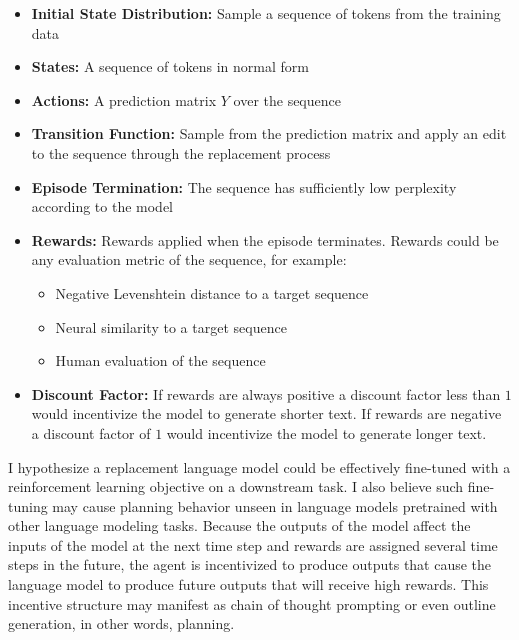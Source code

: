 \documentclass{article}
\begin{document}
\begin{itemize}


    \item{\textbf{Initial State Distribution:} Sample a sequence of tokens from the training data}

    \item {\textbf{States:} A sequence of tokens in normal form}

    \item {\textbf{Actions:} A prediction matrix $Y$ over the sequence}

    \item {\textbf{Transition Function:} Sample from the prediction matrix and apply an edit to the sequence through the replacement process}

    \item {\textbf{Episode Termination:} The sequence has sufficiently low perplexity according to the model}
    
    \item {\textbf{Rewards:} Rewards applied when the episode terminates. Rewards could be any evaluation metric of the sequence, for example:
    \begin{itemize}
        \item {Negative Levenshtein distance to a target sequence}
        \item {Neural similarity to a target sequence}
        \item {Human evaluation of the sequence}
    \end{itemize}}

    \item {\textbf{Discount Factor:} If rewards are always positive a discount factor less than $1$ would incentivize the model to generate shorter text. If rewards are negative a discount factor of $1$ would incentivize the model to generate longer text.}

\end{itemize}

I hypothesize a replacement language model could be effectively fine-tuned with a reinforcement learning objective on a downstream task. I also believe such fine-tuning may cause planning behavior unseen in language models pretrained with other language modeling tasks. Because the outputs of the model affect the inputs of the model at the next time step and rewards are assigned several time steps in the future, the agent is incentivized to produce outputs that cause the language model to produce future outputs that will receive high rewards. This incentive structure may manifest as chain of thought prompting or even outline generation, in other words, planning.
\end{document}
